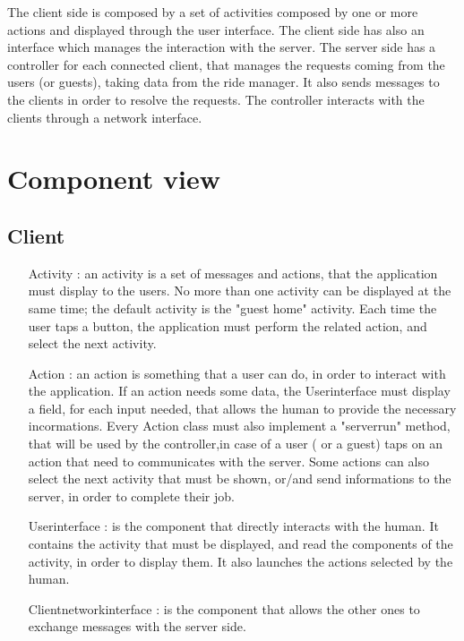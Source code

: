 The client side is composed by a set of activities composed by one or more actions and displayed through the user interface.
The client side has also an interface which manages the interaction with the server.
The server side has a controller for each connected client, that manages the requests coming from the users (or guests), 
taking data from the ride manager. It also sends messages to the clients in order to resolve the requests.
The controller interacts with the clients through a network interface.
\section{Component view}
	\subsection{Client}
	 \begin{itemize}
	  \item [Activity]: an activity is a set of messages and actions, that the application must display to the users.
	  No more than one activity can be displayed at the same time;
	  the default activity is the "guest home" activity. Each time the user taps a button, the application must perform
	  the related action, and select the next activity.
	  \item [Action]: an action is something that a user can do, in order to interact with the application.
	  If an action needs some data, the Userinterface must display a field, for each input needed, that allows the human
	  to provide the necessary incormations. Every Action class must also implement a "serverrun" method, that will be used by
	  the controller,in case of a user ( or a guest) taps on an action that need to communicates with the server. Some actions 
	  can also select the next activity that must be shown, or/and send informations to the server, in order to complete their job.
	  \item [Userinterface]: is the component that directly interacts with the human.
	  It contains the activity that must be displayed, and read the components of the activity, in order to display them.
	  It also launches the actions selected by the human.
	  \item[Clientnetworkinterface]: is the component that allows the other ones to exchange messages with the server side.
	 \end{itemize}
